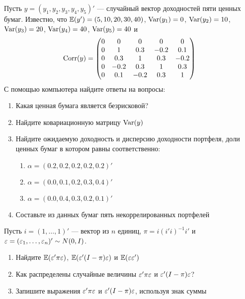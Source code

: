 \documentclass[pdftex,11pt,openany]{book}\usepackage[]{graphicx}\usepackage[]{color}
\begin{document}
\begin{problem}
Пусть $y=(y_1, y_2, y_3, y_4, y_5)'$ --- случайный вектор доходностей пяти ценных бумаг. Известно, что $\mathbb{E}(y')=(5, 10, 20, 30, 40)$, $\operatorname{Var}(y_1)=0$, $\operatorname{Var}(y_2)=10$, $\operatorname{Var}(y_3)=20$, $\operatorname{Var}(y_4)=40$, $\operatorname{Var}(y_5)=40$ и
\[
\operatorname{Corr}(y)=\begin{pmatrix}
0 & 0 & 0 & 0 & 0 \\
0 & 1 & 0.3 & -0.2 & 0.1 \\
0 & 0.3 & 1 & 0.3 & -0.2 \\
0 & -0.2 & 0.3& 1 & 0.3 \\
0 & 0.1 & -0.2 & 0.3 & 1 
\end{pmatrix}
\]
С помощью компьютера найдите ответы на вопросы:
\begin{enumerate}
\item Какая ценная бумага является безрисковой?
\item Найдите ковариационную матрицу $\operatorname{Var}(y)$
\item Найдите ожидаемую доходность и дисперсию доходности портфеля, доли ценных бумаг в котором равны соответственно:
\begin{enumerate}
\item $\alpha=(0.2, 0.2, 0.2, 0.2, 0.2)'$
\item $\alpha=(0.0, 0.1, 0.2, 0.3, 0.4)'$
\item $\alpha=(0.0, 0.4, 0.3, 0.2, 0.1)'$
\end{enumerate}
\item Составьте из данных бумаг пять некоррелированных портфелей 
\end{enumerate}
\end{problem}

\begin{solution}
\newpage
\end{solution}


\begin{problem}
Пусть $i = (1,\dots,1)'$ --- вектор из $n$ единиц, $\pi=i(i'i)^{-1}i'$ и $\varepsilon = (\varepsilon_1,\dots,\varepsilon_n)'\sim N (0,I)$.
\begin{enumerate}
\item Найдите $\mathbb{E}(\varepsilon'\pi\varepsilon)$, $\mathbb{E}(\varepsilon'(I-\pi)\varepsilon)$ и $\mathbb{E}(\varepsilon\varepsilon')$
\item Как распределены случайные величины $\varepsilon'\pi\varepsilon$ и $\varepsilon'(I-\pi)\varepsilon$?
\item Запишите выражения $\varepsilon'\pi\varepsilon$ и $\varepsilon'(I-\pi)\varepsilon$, используя знак суммы
\end{enumerate}
\end{problem}
\end{document}
